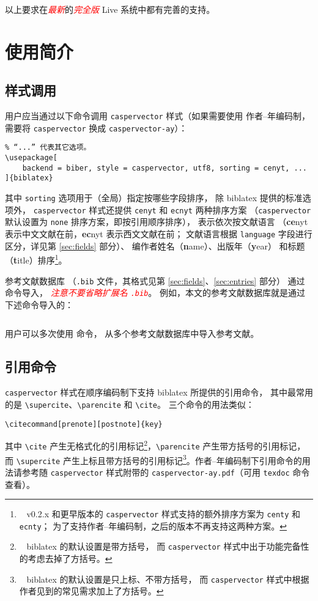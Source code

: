 \documentclass[UTF8]{ctexart}
\newcommand{\myemph}[1]{\emph{\textcolor{red}{#1}}}
\begin{document}
以上要求在\myemph{最新}的\myemph{完全版}
 Live 系统中都有完善的支持。

\section{使用简介}
\subsection{样式调用}

用户应当通过以下命令调用 \verb|caspervector| 样式（如果需要使用
作者--年编码制，需要将 \verb|caspervector| 换成 \verb|caspervector-ay|）：
\begin{Verbatim}[frame = single]
% “utf8”可能需要改为“gbk”，根据用户使用的字符编码而定。
% “...” 代表其它选项。
\usepackage[
	backend = biber, style = caspervector, utf8, sorting = cenyt, ...
]{biblatex}
\end{Verbatim}
其中 \verb|sorting| 选项用于（全局）指定按哪些字段排序，
除 biblatex 提供的标准选项\supercite{biblatex}外，%
\verb|caspervector| 样式还提供 \verb|cenyt| 和 \verb|ecnyt| 两种排序方案
（\verb|caspervector| 默认设置为 \verb|none| 排序方案，即按引用顺序排序），
表示依次按文献语言
（\textbf{ce}nyt 表示中文文献在前，\textbf{ec}nyt 表示西文文献在前；
文献语言根据 \verb|language| 字段进行区分，详见第 \ref{sec:fields} 部分）、
编作者姓名（\textbf{n}ame）、出版年（\textbf{y}ear）
和标题（\textbf{t}itle）排序\footnote{\ %
	v0.2.x 和更早版本的 \texttt{caspervector}
	样式支持的额外排序方案为 \texttt{centy} 和 \texttt{ecnty}；
	为了支持作者--年编码制，之后的版本不再支持这两种方案。%
}。

参考文献数据库
（\verb|.bib| 文件，其格式见第 \ref{sec:fields}、\ref{sec:entries} 部分）
通过 \verb|| 命令导入，%
\myemph{注意不要省略扩展名 \texttt{.bib}}。
例如，本文的参考文献数据库就是通过下述命令导入的：
\begin{Verbatim}[frame = single]

\end{Verbatim}
用户可以多次使用 \verb|| 命令，
从多个参考文献数据库中导入参考文献。

\subsection{引用命令}

\verb|caspervector| 样式在顺序编码制下支持 biblatex 所提供的引用命令，
其中最常用的是 \verb|\supercite|、\verb|\parencite| 和 \verb|\cite|。
三个命令的用法类似：
\begin{Verbatim}[frame = single]
% 可选参数 prenote 和 postnote 分别用于设定引用记号前、后的注释。
\citecommand[prenote][postnote]{key}
\end{Verbatim}
其中 \verb|\cite| 产生无格式化的引用标记\footnote{\ %
	biblatex 的默认设置是带方括号，
	而 \texttt{caspervector} 样式中出于功能完备性的考虑去掉了方括号。%
}，\verb|\parencite| 产生带方括号的引用标记，
而 \verb|\supercite| 产生上标且带方括号的引用标记\footnote{\ %
	biblatex 的默认设置是只上标、不带方括号，
	而 \texttt{caspervector} 样式中根据作者见到的常见需求加上了方括号。%
}。作者--年编码制下引用命令的用法请参考随 \verb|caspervector|
样式附带的 \verb|caspervector-ay.pdf|（可用 \verb|texdoc| 命令查看）。
\end{document}
